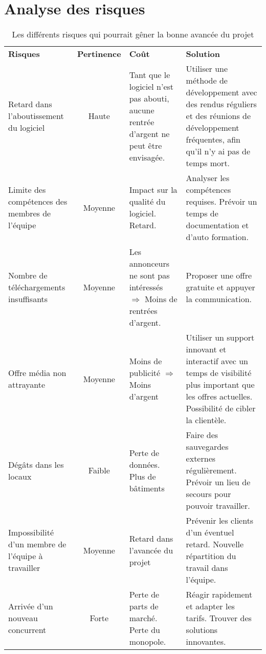	\chapter{Analyse des risques}
  \begin{table}[H]
	  \centering
	  \begin{tabular}{|p{4.8cm}|c|p{4.8cm}|p{4.8cm}|}
		  \hline
		  \textbf{Risques} & \textbf{Pertinence} & \textbf{Coût} & \textbf{Solution} \\
			Retard dans l'aboutissement du logiciel & 	
			Haute & 
			Tant que le logiciel n'est pas abouti, aucune rentrée d'argent ne peut être envisagée.	&
			Utiliser une méthode de développement avec des rendus réguliers et des réunions de développement fréquentes, afin qu'il n'y ai pas de temps mort.\\
			Limite des compétences des membres de l'équipe & Moyenne & Impact sur la qualité du logiciel. Retard. &
			Analyser les compétences requises. Prévoir un temps de documentation et d'auto formation.\\

			Nombre de téléchargements insuffisants & 	
			Moyenne & 
			Les annonceurs ne sont pas intéressés $\Rightarrow$ Moins de rentrées d'argent.& Proposer une offre gratuite et appuyer la communication.\\

			Offre média non attrayante & 	
			Moyenne & Moins de publicité $\Rightarrow$ Moins d'argent 
			& Utiliser un support innovant et interactif avec un temps de visibilité plus important que les offres actuelles. Possibilité de cibler la clientèle.\\
			Dégâts dans les locaux & Faible & Perte de données. Plus de bâtiments & Faire des sauvegardes externes régulièrement. Prévoir un lieu de secours pour pouvoir travailler.\\
			Impossibilité d'un membre de l'équipe à travailler & Moyenne & Retard dans l'avancée du projet 
			& Prévenir les clients d'un éventuel retard. Nouvelle répartition du travail dans l'équipe.\\ 
			Arrivée d'un nouveau concurrent & Forte & Perte de parts de marché. Perte du monopole. & Réagir rapidement et adapter les tarifs. Trouver des solutions innovantes.\\
			\hline
	  \end{tabular}
	  \caption{Les différents risques qui pourrait gêner la bonne avancée du projet}
	  \label{tab:risques}
  \end{table}
